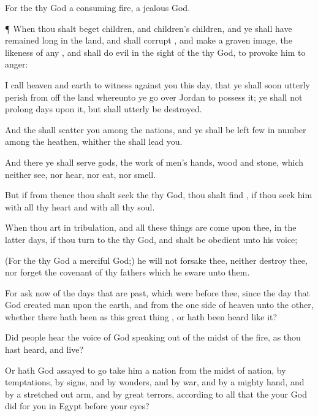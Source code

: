 {For the
{} thy
God
{} a
consuming
fire,
{} a
jealous
God.


\par }{\PP {}¶ When thou shalt
beget
children, and
children’s
children, and ye shall have remained
long in the
land, and shall
corrupt
{}, and
make a graven
image,
{} the
likeness of any
{}, and shall
do
evil in the
sight of the
{} thy
God, to provoke him to
anger:

I
call
heaven and
earth to
witness against you this
day, that ye shall
soon
utterly
perish from off the
land whereunto ye go
over
Jordan to
possess it; ye shall not
prolong
{}
days upon it, but shall
utterly be
destroyed.

And the
{} shall
scatter you among the
nations, and ye shall be
left
few in
number among the
heathen, whither the
{} shall
lead you.

And there ye shall
serve
gods, the
work of
men’s
hands,
wood and
stone, which neither
see, nor
hear, nor
eat, nor
smell.

But if from thence thou shalt
seek the
{} thy
God, thou shalt
find
{}, if thou
seek him with all thy
heart and with all thy
soul.

When thou art in
tribulation, and all these
things are
come upon thee,
{} in the
latter
days, if thou
turn to the
{} thy
God, and shalt be
obedient unto his
voice;

(For the
{} thy
God
{} a
merciful
God;) he will not
forsake thee, neither
destroy thee, nor
forget the
covenant of thy
fathers which he
sware unto them.

For
ask now of the
days that are
past, which
were
before thee, since the
day that
God
created
man upon the
earth, and
{} from the one
side of
heaven unto the other, whether there hath been
{} as this
great
thing
{}, or hath been
heard like it?

Did
{}
people
hear the
voice of
God speaking
out of the
midst of the
fire, as thou hast
heard, and
live?

Or hath
God
assayed to
go
{}
take him a
nation from the
midst of
{}
nation, by
temptations, by
signs, and by
wonders, and by
war, and by a
mighty
hand, and by a stretched
out
arm, and by
great
terrors, according to all that the
{} your
God
did for you in
Egypt before your
eyes?

}
